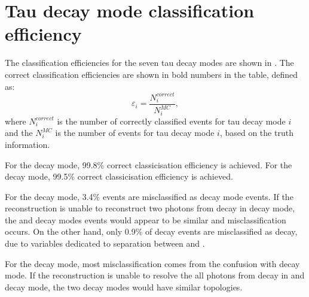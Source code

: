 \section{Tau decay mode classification efficiency}
\label{sec:tauClassificationEff}
The classification efficiencies for the seven tau decay modes are shown in . The correct classification efficiencies are shown in bold numbers in the table, defined as:
\begin{equation}
\varepsilon_i = \frac{N^{correct}_i}{N^{MC}_i},
\label{eqn:tauEff}
\end{equation}
where $N^{correct}_i$ is the number of correctly classified events for tau decay mode $i$ and the $N^{MC}_i$ is the number of events for tau decay mode $i$, based on the truth information.

For the \decayElectronShort decay mode,   99.8\%  correct classicisation efficiency is achieved. For the \decayMuonShort decay mode,  99.5\% correct classicisation efficiency is achieved.


For the \decayPionShort decay mode, 3.4\% events are misclassified as \decayRhoShortest decay mode events. If the reconstruction is unable to reconstruct two photons from \Ppizero decay in \decayRhoShortest decay mode, the \decayPionShort and \decayRhoShortest decay modes events would appear to be similar and misclassification occurs. On the other hand, only 0.9\% of \decayPionShort decay events are misclassified as \decayElectronShort decay, due to variables dedicated to separation between \Pem and \Ppiminus.



For the \decayRhoShortest decay mode, most misclassification comes from the confusion with \decayAiPhotonShortest decay mode.  If the reconstruction is unable to resolve the all photons from \Ppizero decay in \decayRhoShortest and \decayAiPhotonShortest decay mode, the two decay modes would have similar topologies.

